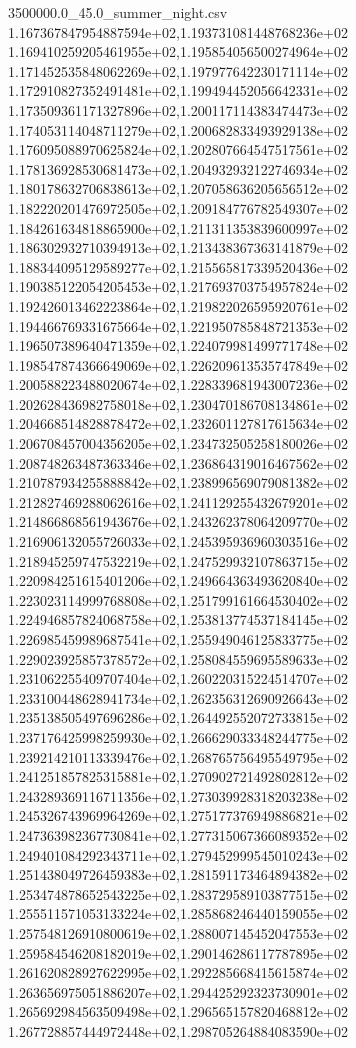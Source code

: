 \begin{filecontents*}{3500000.0_45.0_summer_night.csv}
1.167367847954887594e+02,1.193731081448768236e+02
1.169410259205461955e+02,1.195854056500274964e+02
1.171452535848062269e+02,1.197977642230171114e+02
1.172910827352491481e+02,1.199494452056642331e+02
1.173509361171327896e+02,1.200117114383474473e+02
1.174053114048711279e+02,1.200682833493929138e+02
1.176095088970625824e+02,1.202807664547517561e+02
1.178136928530681473e+02,1.204932932122746934e+02
1.180178632706838613e+02,1.207058636205656512e+02
1.182220201476972505e+02,1.209184776782549307e+02
1.184261634818865900e+02,1.211311353839600997e+02
1.186302932710394913e+02,1.213438367363141879e+02
1.188344095129589277e+02,1.215565817339520436e+02
1.190385122054205453e+02,1.217693703754957824e+02
1.192426013462223864e+02,1.219822026595920761e+02
1.194466769331675664e+02,1.221950785848721353e+02
1.196507389640471359e+02,1.224079981499771748e+02
1.198547874366649069e+02,1.226209613535747849e+02
1.200588223488020674e+02,1.228339681943007236e+02
1.202628436982758018e+02,1.230470186708134861e+02
1.204668514828878472e+02,1.232601127817615634e+02
1.206708457004356205e+02,1.234732505258180026e+02
1.208748263487363346e+02,1.236864319016467562e+02
1.210787934255888842e+02,1.238996569079081382e+02
1.212827469288062616e+02,1.241129255432679201e+02
1.214866868561943676e+02,1.243262378064209770e+02
1.216906132055726033e+02,1.245395936960303516e+02
1.218945259747532219e+02,1.247529932107863715e+02
1.220984251615401206e+02,1.249664363493620840e+02
1.223023114999768808e+02,1.251799161664530402e+02
1.224946857824068758e+02,1.253813774537184145e+02
1.226985459989687541e+02,1.255949046125833775e+02
1.229023925857378572e+02,1.258084559695589633e+02
1.231062255409707404e+02,1.260220315224514707e+02
1.233100448628941734e+02,1.262356312690926643e+02
1.235138505497696286e+02,1.264492552072733815e+02
1.237176425998259930e+02,1.266629033348244775e+02
1.239214210113339476e+02,1.268765756495549795e+02
1.241251857825315881e+02,1.270902721492802812e+02
1.243289369116711356e+02,1.273039928318203238e+02
1.245326743969964269e+02,1.275177376949886821e+02
1.247363982367730841e+02,1.277315067366089352e+02
1.249401084292343711e+02,1.279452999545010243e+02
1.251438049726459383e+02,1.281591173464894382e+02
1.253474878652543225e+02,1.283729589103877515e+02
1.255511571053133224e+02,1.285868246440159055e+02
1.257548126910800619e+02,1.288007145452047553e+02
1.259584546208182019e+02,1.290146286117787895e+02
1.261620828927622995e+02,1.292285668415615874e+02
1.263656975051886207e+02,1.294425292323730901e+02
1.265692984563509498e+02,1.296565157820468812e+02
1.267728857444972448e+02,1.298705264884083590e+02

\end{filecontents*}
